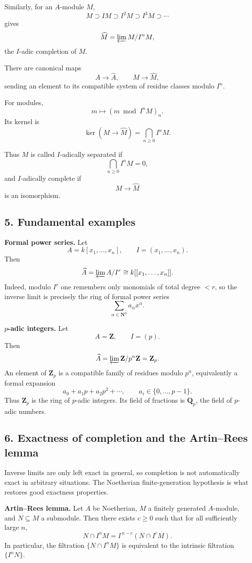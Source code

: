 \documentclass[12pt,a4paper]{article}
\theoremstyle{plain}
\theoremstyle{definition}      %
\begin{document}
Similarly, for an \(A\)-module \(M\),
\[
M\supset IM\supset I^2M\supset I^3M\supset \cdots
\]
gives
\[
\widehat M=\varprojlim M/I^nM,
\]
the \(I\)-adic completion of \(M\).

\medskip
There are canonical maps
\[
A\to \widehat A,\qquad M\to \widehat M,
\]
sending an element to its compatible system of residue classes modulo \(I^n\).

For modules,
\[
m\mapsto (m \bmod I^nM)_n.
\]
Its kernel is
\[
\ker(M\to \widehat M)=\bigcap_{n\ge0} I^nM.
\]

Thus \(M\) is called \(I\)-adically separated if
\[
\bigcap_{n\ge0} I^nM=0,
\]
and \(I\)-adically complete if
\[
M\to \widehat M
\]
is an isomorphism.

\subsection*{5. Fundamental examples}

\textbf{Formal power series.}
Let
\[
A=k[x_1,\dots,x_n],\qquad I=(x_1,\dots,x_n).
\]
Then
\[
\widehat A=\varprojlim A/I^r \cong k[[x_1,\dots,x_n]].
\]
Indeed, modulo \(I^r\) one remembers only monomials of total degree \(<r\), so the inverse limit is precisely the ring of formal power series
\[
\sum_{\alpha\in \mathbf N^n} a_\alpha x^\alpha.
\]

\medskip
\textbf{\(p\)-adic integers.}
Let
\[
A=\mathbf Z,\qquad I=(p).
\]
Then
\[
\widehat A=\varprojlim \mathbf Z/p^n\mathbf Z=\mathbf Z_p.
\]
An element of \(\mathbf Z_p\) is a compatible family of residues modulo \(p^n\), equivalently a formal expansion
\[
a_0+a_1p+a_2p^2+\cdots,
\qquad a_i\in\{0,\dots,p-1\}.
\]
Thus \(\mathbf Z_p\) is the ring of \(p\)-adic integers. Its field of fractions is \(\mathbf Q_p\), the field of \(p\)-adic numbers.

\subsection*{6. Exactness of completion and the Artin--Rees lemma}

Inverse limits are only left exact in general, so completion is not automatically exact in arbitrary situations. The Noetherian finite-generation hypothesis is what restores good exactness properties.

\medskip
\textbf{Artin--Rees lemma.}
Let \(A\) be Noetherian, \(M\) a finitely generated \(A\)-module, and \(N\subseteq M\) a submodule. Then there exists \(c\ge0\) such that for all sufficiently large \(n\),
\[
N\cap I^nM = I^{\,n-c}(N\cap I^cM).
\]
In particular, the filtration \(\{N\cap I^nM\}\) is equivalent to the intrinsic filtration \(\{I^nN\}\).
\end{document}
